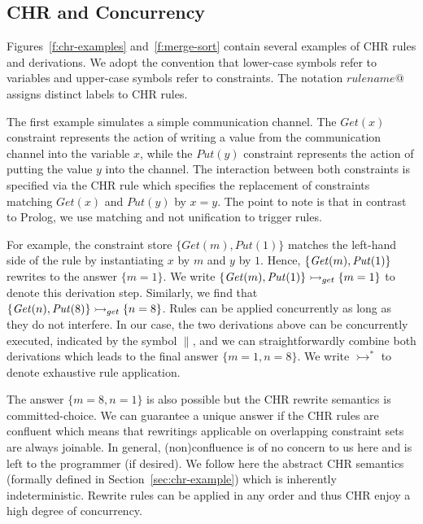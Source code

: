 \documentclass{tlp}
\begin{document}
\subsection{CHR and Concurrency}

Figures~\ref{f:chr-examples} 
and~\ref{f:merge-sort} contain several examples of CHR rules and derivations.
We adopt the convention that lower-case symbols refer to variables and upper-case symbols refer to
constraints. The notation $\mathit{rulename \atsign}$ assigns distinct labels to CHR rules.

The first example simulates a simple communication channel.
The $\mathit{Get(x)}$ constraint represents the action of writing a value from the communication
channel into the variable $x$, while the $\mathit{Put(y)}$ constraint represents the action
of putting the value $y$ into the channel.
The interaction between both constraints is specified via the CHR rule  which
specifies the  replacement of constraints matching $\mathit{Get(x)}$ and $\mathit{Put(y)}$ by $x=y$.
The point to note is that
in contrast to Prolog, we use matching and not unification to trigger rules.

For example, the constraint store $\mathit{\{Get(m),Put(1)\}}$ matches the left-hand side of 
the  rule
by instantiating $x$ by $m$ and $y$ by $1$. Hence, 
$\{\mathit{Get}(m),\mathit{Put}(1)\}$
rewrites to the answer $\{m=1\}$.
We write $\{\mathit{Get}(m),\mathit{Put}(1)\} \rightarrowtail_{get} \{ m=1 \}$ to denote this derivation step.
Similarly, we find that
$\{\mathit{Get}(n),\mathit{Put}(8)\} \rightarrowtail_{get} \{ n=8 \}$.
Rules can be applied concurrently as long as they do not interfere.
In our case, the two derivations above can be concurrently executed, indicated by the 
symbol $\parallel$, and we can straightforwardly combine both derivations
which leads to the final answer $\{ m=1, n=8 \}$.
We write $\rightarrowtail^*$ to denote exhaustive rule application.

The answer $\{m=8,n=1\}$ is also possible but the CHR rewrite semantics is committed-choice. 
We can guarantee a unique answer if the CHR rules are confluent which
means that rewritings applicable on overlapping constraint sets are always joinable.
In general, (non)confluence is of no concern to us here and is left to the programmer (if desired).
We follow here the abstract CHR semantics~\cite{fruehwirth98:chr:art}
(formally defined in Section~\ref{sec:chr-example})
which is inherently indeterministic.  Rewrite rules can be applied in any order
and thus CHR enjoy a high degree of concurrency.
\end{document}
